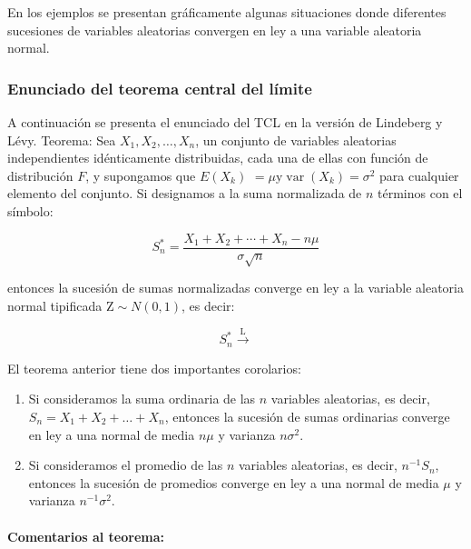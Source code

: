\documentclass[
]{article}
\begin{document}
En los ejemplos se presentan gráficamente algunas situaciones donde diferentes sucesiones de variables aleatorias convergen en ley a una variable aleatoria normal.

\subsubsection{Enunciado del teorema central del límite}\label{enunciado-del-teorema-central-del-luxedmite}

A continuación se presenta el enunciado del TCL en la versión de Lindeberg y Lévy.
Teorema:
Sea \(X_{1}, X_{2}, \ldots, X_{n}\), un conjunto de variables aleatorias independientes idénticamente distribuidas, cada una de ellas con función de distribución \(F\), y supongamos que \(E\left(X_{k}\right)\) \(=\mu \mathrm{y} \operatorname{var}\left(X_{k}\right)=\sigma^{2}\) para cualquier elemento del conjunto. Si designamos a la suma normalizada de \(n\) términos con el símbolo:

\[
S_{n}^{*}=\frac{X_{1}+X_{2}+\cdots+X_{n}-n \mu}{\sigma \sqrt{n}}
\]

entonces la sucesión de sumas normalizadas converge en ley a la variable aleatoria normal tipificada \(\mathrm{Z} \sim N(0,1)\), es decir:

\[
S_{n}^{*} \xrightarrow{\mathrm{L}}
\]

El teorema anterior tiene dos importantes corolarios:

\begin{enumerate}
\def\labelenumi{\arabic{enumi}.}
\item
  Si consideramos la suma ordinaria de las \(n\) variables aleatorias, es decir, \(S_{n}=X_{1}+X_{2}+\ldots+X_{n}\), entonces la sucesión de sumas ordinarias converge en ley a una normal de media \(n \mu\) y varianza \(n \sigma^{2}\).
\item
  Si consideramos el promedio de las \(n\) variables aleatorias, es decir, \(n^{-1} S_{n}\), entonces la sucesión de promedios converge en ley a una normal de media \(\mu\) y varianza \(n^{-1} \sigma^{2}\).
\end{enumerate}

\paragraph{Comentarios al teorema:}\label{comentarios-al-teorema}
\end{document}
